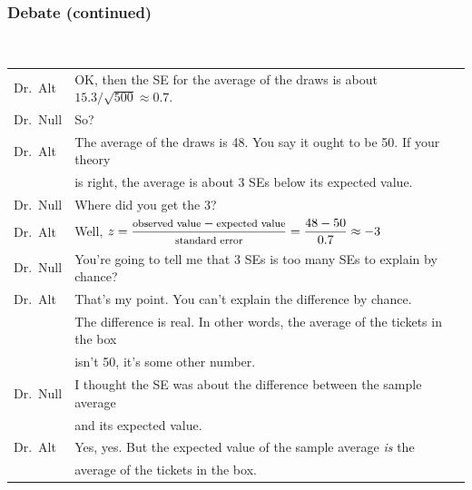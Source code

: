 \documentclass[t]{beamer}
\begin{document}
\begin{frame}
\frametitle{Debate (continued) }
{\ }

{\footnotesize
\begin{tabular}{ll}
{\color{blue}Dr.\ Alt} & {\color{blue}OK, then the SE for the average of the draws is about $15.3/\sqrt{500} \approx 0.7$.}\\[2pt]
Dr.\ Null & So?\\[2pt]
{\color{blue}Dr.\ Alt} & {\color{blue}The average of the draws is 48.  You say it ought to be 50.  If your theory}  \\ 
    & {\color{blue}is right, the average is about 3 SEs below its expected value.}\\[2pt]
Dr.\ Null & Where did you get the 3?\\[5pt]
{\color{blue}Dr.\ Alt} & {\color{blue}Well, }
{\color{blue} $\displaystyle z = 
     \frac{\mbox{\footnotesize observed value} -
     \mbox{\footnotesize expected value}}{\mbox{\footnotesize standard error}}
      = \frac{48-50}{0.7}\approx -3$}\vspace{5pt}
\\[5pt]
Dr.\ Null & You're going to tell me that 3 SEs is too many SEs to explain by chance?\\[2pt]
{\color{blue}Dr.\ Alt} & {\color{blue}That's my point.  You can't explain the difference by chance.}  
   \\ & {\color{blue}The difference is real.  In other words, the average of the tickets in the box}\\
   & {\color{blue}isn't 50, it's some other number.}\\[2pt]
Dr.\ Null & I thought the SE was about the difference between the sample average \\ & 
    and its expected value.\\[2pt]
{\color{blue}Dr.\ Alt}  & {\color{blue}Yes, yes.  But the expected value of the sample average \textit{is} the} \\ & 
     {\color{blue}average of the tickets in the box.}
\end{tabular}}
\end{frame}
\end{document}
